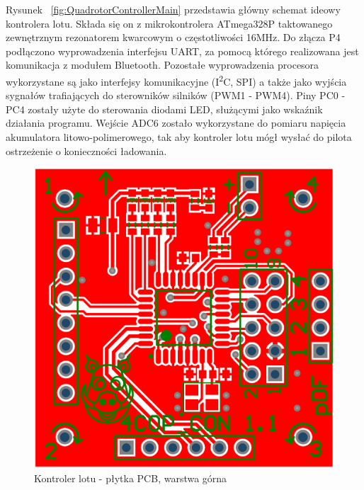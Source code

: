 Rysunek ~\ref{fig:QuadrotorControllerMain} przedstawia główny schemat ideowy kontrolera lotu. Składa się on z mikrokontrolera ATmega328P taktowanego zewnętrznym rezonatorem kwarcowym o częstotliwości 16MHz. Do złącza P4 podłączono wyprowadzenia interfejsu UART, za pomocą którego realizowana jest komunikacja z modułem Bluetooth. Pozostałe wyprowadzenia procesora wykorzystane są jako interfejsy komunikacyjne (I\textsuperscript{2}C, SPI) a także jako wyjścia sygnałów trafiających do sterowników silników (PWM1 - PWM4). Piny PC0 - PC4 zostały użyte do sterowania diodami LED, służącymi jako wskaźnik działania programu. Wejście ADC6 zostało wykorzystane do pomiaru napięcia akumulatora litowo-polimerowego, tak aby kontroler lotu mógł wysłać do pilota ostrzeżenie o konieczności ładowania. 

\begin{figure}[H]
	\centering
	\includegraphics[scale=0.24]{Pictures/QuadrotorControllerPCB_TOP.png}
		\caption[Kontroler lotu - płytka PCB, warstrwa górna]{Kontroler lotu - płytka PCB, warstwa górna}
	\label{fig:QuadrotorControllerPCB_TOP}
\end{figure}

